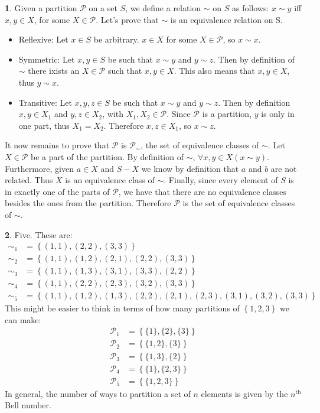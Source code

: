 \documentclass{article}
\theoremstyle{definition}
\newcommand{\PS}{\mathcal{P}}
\newcommand{\set}[1]{\left\{#1\right\}}
\theoremstyle{definition}
\theoremstyle{definition}
\newtheorem{solution-internal}{}[subsection]
\newenvironment{solution}{
  \medskip
  \begin{solution-internal}
}{
  \end{solution-internal}
}
\begin{document}
\begin{solution}
Given a partition $\mathcal{P}$ on a set $S$, we define a relation $\sim$ on
$S$ as follows: $x \sim y$ iff $x, y \in X$, for some $X \in \mathcal{P}$.
Let's prove that $\sim$ is an equivalence relation on S.
\begin{itemize}
  \item Reflexive: Let $x \in S$ be arbitrary. $x \in X$ for some $X \in
    \mathcal{P}$, so $x \sim x$.
  \item Symmetric: Let $x, y \in S$ be such that $x \sim y$ and $y \sim z$.
Then by definition of $\sim$ there ixists an $X \in \PS$ such that $x, y \in X$.
This also means that $x, y \in X$, thus $y \sim x$.
  \item Transitive: Let $x, y, z \in S$ be such that $x \sim y$ and $y \sim z$.
Then by definition $x, y \in X_1$ and $y,z \in X_2$, with $X_1, X_2 \in \PS$.
Since $\PS$ is a partition, $y$ is only in one part, thus $X_1 = X_2$. Therefore
$x, z \in X_1$, so $x \sim z$.
\end{itemize}
It now remains to prove that $\PS$ is $\PS_{\sim}$, the set of equivalence classes of $\sim$. Let $X \in \PS$ be a part of the partition. By definition of $\sim$, $\forall x, y \in X (x \sim y)$. Furthermore, given $a \in X$ and $S - X$ we know by definition that $a$ and $b$ are not related. Thus $X$ is an equivalence class of $\sim$. Finally, since every element of $S$ is in exactly one of the parts of $\PS$, we have that there are no equivalence classes besides the ones from the partition. Therefore $\PS$ is the set of equivalence classes of $\sim$.
\end{solution}

\begin{solution}
Five. These are:
\begin{align*}
  \sim_1 &= \set{(1,1), (2,2), (3,3)} \\
  \sim_2 &= \set{(1,1), (1,2), (2,1), (2,2), (3,3)} \\
  \sim_3 &= \set{(1,1), (1,3), (3,1), (3,3), (2,2)} \\
  \sim_4 &= \set{(1,1), (2,2), (2,3), (3,2), (3,3)} \\
  \sim_5 &= \set{(1,1), (1,2), (1,3), (2,2), (2,1), (2,3), (3,1), (3,2), (3,3)}
\end{align*}
This might be easier to think in terms of how many partitions of $\set{1,2,3}$ we can make:
\begin{align*}
  \PS_1 &= \set{\{1\}, \{2\}, \{3\}} \\
  \PS_2 &= \set{\{1, 2\}, \{3\}} \\
  \PS_3 &= \set{\{1, 3\}, \{2\}} \\
  \PS_4 &= \set{\{1\}, \{2, 3\}} \\
  \PS_5 &= \set{\{1, 2, 3\}}
\end{align*}
In general, the number of ways to partition a set of $n$ elements is given by the $n^{\text{th}}$ Bell number.
\end{solution}
\end{document}
